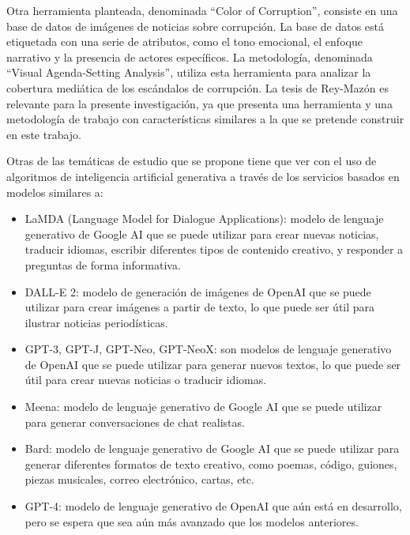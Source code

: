 \documentclass[12pt]{article}
\begin{document}
Otra herramienta planteada, denominada ``Color of Corruption'', consiste en una base de datos de imágenes de noticias sobre corrupción. La base de datos está etiquetada con una serie de atributos, como el tono emocional, el enfoque narrativo y la presencia de actores específicos. La metodología, denominada ``Visual Agenda-Setting Analysis'', utiliza esta herramienta para analizar la cobertura mediática de los escándalos de corrupción. La tesis de Rey-Mazón es relevante para la presente investigación, ya que presenta una herramienta y una metodología de trabajo con características similares a la que se pretende construir en este trabajo. 



Otras de las temáticas de estudio que se propone tiene que ver con el uso de algoritmos de inteligencia artificial generativa a través de los servicios basados en modelos similares a:  


\begin{itemize}
    \item LaMDA (Language Model for Dialogue Applications): modelo de lenguaje generativo de Google AI que se puede utilizar para crear nuevas noticias, traducir idiomas, escribir diferentes tipos de contenido creativo, y responder a preguntas de forma informativa.
    \item DALL-E 2: modelo de generación de imágenes de OpenAI que se puede utilizar para crear imágenes a partir de texto, lo que puede ser útil para ilustrar noticias periodísticas.
    \item GPT-3, GPT-J, GPT-Neo, GPT-NeoX: son modelos de lenguaje generativo de OpenAI que se puede utilizar para generar nuevos textos, lo que puede ser útil para crear nuevas noticias o traducir idiomas.
    \item Meena: modelo de lenguaje generativo de Google AI que se puede utilizar para generar conversaciones de chat realistas.
    \item Bard: modelo de lenguaje generativo de Google AI que se puede utilizar para generar diferentes formatos de texto creativo, como poemas, código, guiones, piezas musicales, correo electrónico, cartas, etc.
    \item GPT-4: modelo de lenguaje generativo de OpenAI que aún está en desarrollo, pero se espera que sea aún más avanzado que los modelos anteriores. 
\end{itemize}
\end{document}

